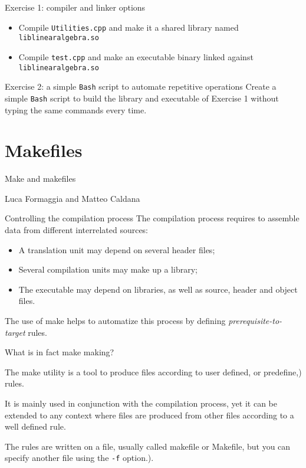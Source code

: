 \documentclass[10pt,aspectratio=169]{beamer}
\newcommand{\blue}{\color{blue}}
\begin{document}
\begin{frame}{Exercise 1: compiler and linker options}
  \begin{itemize}
  \item Compile \texttt{Utilities.cpp} and make it a shared library named \texttt{liblinearalgebra.so}\\[5mm]
  \item Compile \texttt{test.cpp} and make an executable binary linked against \texttt{liblinearalgebra.so}
  \end{itemize}
\end{frame}

\begin{frame}{Exercise 2: a simple \texttt{Bash} script to automate repetitive operations}
  Create a simple \texttt{Bash} script to build the library and executable of Exercise 1 without typing the same commands every time.
\end{frame}

\section*{Makefiles}

\begin{frame}
\centering
{ \huge Make and makefiles}\\

\vspace{1cm}

\large Luca Formaggia and Matteo Caldana
\end{frame}

\begin{frame}{Controlling the compilation process}
The compilation process requires to assemble data from different interrelated sources:
\smallskip

\begin{itemize}
\item A translation unit may depend on several header files; 
\item Several compilation units may make up a library;
\item The executable may depend on libraries, as well as source, header and object files.
\end{itemize}

The use of \alert{make} helps to automatize this process by defining
\emph{prerequisite-to-target} rules.
\end{frame}


\begin{frame}{What is in fact make making?}

  The \alert{make} utility is a tool to produce files according to user
  defined, or predefine,) rules.  \medskip

  It is mainly used in conjunction with the \alert{compilation process},
  yet it can be extended to any context where files are produced from
  other files according to a well defined rule.  \medskip

  The rules are written on a file, usually called {\blue makefile} or
  {\blue Makefile}, but you can specify another file using the \texttt{-f} option.).  
\end{frame}
\end{document}
